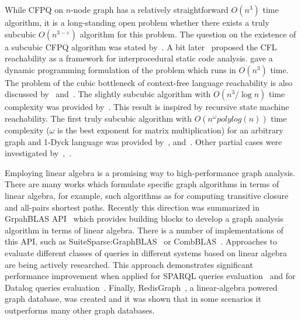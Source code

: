 While CFPQ on $n$-node graph has a relatively straightforward $O(n^3)$ time algorithm, it is a long-standing open problem whether there exists a truly  subcubic $O(n^{3-\varepsilon})$ algorithm for this problem.
The question on the existence of a subcubic CFPQ algorithm was stated by~\cite{Yannakakis}.
A bit later~\cite{10.5555/271338.271343} proposed the CFL reachability as a framework for interprocedural static code analysis.
\cite{10.1145/258994.259006} gave a dynamic programming formulation of the problem which runs in $O(n^3)$ time.
The problem of the cubic bottleneck of context-free language reachability is also discussed by~\cite{10.5555/788019.788876} and~\cite{10.1145/258994.259006}.
The slightly subcubic algorithm with $O(n^3/\log{n})$ time complexity was provided by~\cite{10.1145/1328438.1328460}.
This result is inspired by recursive state machine reachability.
The first truly subcubic algorithm with $O(n^\omega polylog(n))$ time complexity ($\omega$ is the best exponent for matrix multiplication) for an arbitrary graph and 1-Dyck language was provided by~\cite{8249039}, and~\cite{pavlogiannis2020finegrained}.
Other partial cases were investigated by~\cite{10.1145/3158118},~\cite{zhang2020conditional}.

Employing linear algebra is a promising way to high-performance graph analysis.
There are many works which formulate specific graph algorithms in terms of linear algebra, for example, such algorithms as for computing transitive closure and all-pairs shortest paths.
Recently this direction was summarized in GrpahBLAS API~\cite{7761646} which provides building blocks to develop a graph analysis algorithm in terms of linear algebra.
There is a number of implementations of this API, such as SuiteSparse:GraphBLAS~\cite{10.1145/3322125} or CombBLAS~\cite{10.1177/1094342011403516}.
Approaches to evaluate different classes of queries in different systems based on linear algebra are being actively researched.
This approach demonstrates significant performance improvement when applied for SPARQL queries evaluation~\cite{10.1145/3302424.3303962,DBLP:journals/corr/MetzlerM15a} and for Datalog queries evaluation~\cite{sato_2017}.
Finally, RedisGraph~\cite{8778293}, a linear-algebra powered graph database, was created and it was shown that in some scenarios it outperforms many other graph databases.